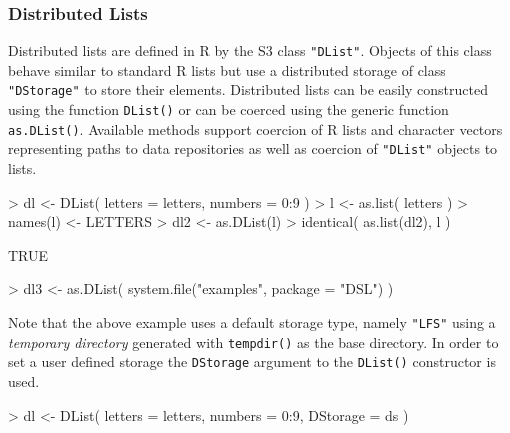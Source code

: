 \documentclass[fleqn]{article}
\let\code=\texttt
\let\proglang=\textsf
\newcommand{\class}[1]{\code{"#1"}}
\begin{document}
\subsubsection{Distributed Lists}

Distributed lists are defined in \proglang{R} by the S3 class
\class{DList}. Objects of this class behave similar to standard
\proglang{R} lists but use a distributed storage of class
\class{DStorage} to store their elements. Distributed lists can be
easily constructed using the function \code{DList()} or can be coerced
using the generic function \code{as.DList()}. Available methods
support coercion of \proglang{R} lists and character vectors
representing paths to data repositories as well as coercion of
\class{DList} objects to lists.

\begin{Schunk}
\begin{Sinput}
> dl <- DList( letters = letters, numbers = 0:9  )
> l <- as.list( letters )
> names(l) <- LETTERS
> dl2 <- as.DList(l)
> identical( as.list(dl2), l )
\end{Sinput}
\begin{Soutput}
[1] TRUE
\end{Soutput}
\begin{Sinput}
> dl3 <- as.DList( system.file("examples", package = "DSL") )
\end{Sinput}
\end{Schunk}

Note that the above example uses a default storage type, namely
\code{"LFS"} using a \emph{temporary directory} generated with
\code{tempdir()} as the base directory. In order to set a user defined
storage the \code{DStorage} argument to the \code{DList()}
constructor is used.

\begin{Schunk}
\begin{Sinput}
> dl <- DList( letters = letters, numbers = 0:9, DStorage = ds )
\end{Sinput}
\end{Schunk}
\end{document}
